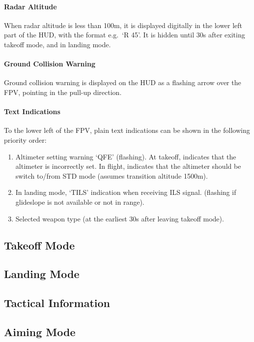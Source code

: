 \paragraph{Radar Altitude}
When radar altitude is less than 100m, it is displayed digitally
in the lower left part of the HUD, with the format e.g.\ `R 45'.
It is hidden until 30s after exiting takeoff mode, and in landing mode.

\paragraph{Ground Collision Warning}
Ground collision warning is displayed on the HUD as
a flashing arrow over the FPV, pointing in the pull-up direction.

\paragraph{Text Indications}
To the lower left of the FPV, plain text indications
can be shown in the following priority order:
\begin{enumerate}
  \item Altimeter setting warning `QFE' (flashing).
    At takeoff, indicates that the altimeter is incorrectly set.
    In flight, indicates that the altimeter should be switch to/from STD mode
    (assumes transition altitude 1500m).
  \item In landing mode, `TILS' indication when receiving ILS signal.
    (flashing if glideslope is not available or not in range).
  \item Selected weapon type (at the earliest 30s after leaving takeoff mode).
\end{enumerate}


\subsection{Takeoff Mode}

\subsection{Landing Mode}

\subsection{Tactical Information}

\subsection{Aiming Mode}
